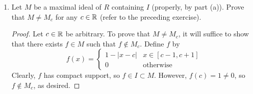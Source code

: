 \documentclass[../psets.tex]{subfiles}
\begin{document}
\begin{enumerate}[resume]
\begin{enumerate}[label={\textbf{(\alph*)}}]
\begin{proof}
\begin{align*}
                a(x+1) &= a(x)&
                b(x+1) &= b(x)
            \end{align*}
            Then $ab=0$, which is compactly supported, but neither $a$ nor $b$ is compactly supported in its own right. Therefore, $I$ is not a prime ideal, as desired.
        \end{proof}
        \item Let $M$ be a maximal ideal of $R$ containing $I$ (properly, by part (a)). Prove that $M\neq M_c$ for any $c\in\mathbb{R}$ (refer to the preceding exercise).
        \begin{proof}
            Let $c\in\mathbb{R}$ be arbitrary. To prove that $M\neq M_c$, it will suffice to show that there exists $f\in M$ such that $f\notin M_c$. Define $f$ by
            \begin{equation*}
                f(x) =
                \begin{cases}
                    1-|x-c| & x\in[c-1,c+1]\\
                    0 & \text{otherwise}
                \end{cases}
            \end{equation*}
            Clearly, $f$ has compact support, so $f\in I\subset M$. However, $f(c)=1\neq 0$, so $f\notin M_c$, as desired.
        \end{proof}
    \end{enumerate}
\end{enumerate}
\end{document}
